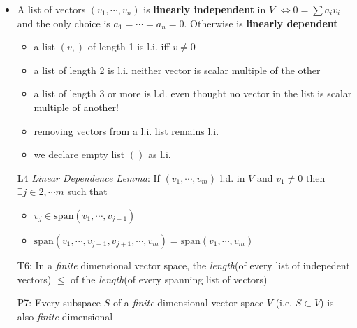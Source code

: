 \begin{itemize}
\item A list of vectors $(v_1,\cdots,v_n)$ is \textbf{linearly independent} in $V$ $\iff 0 = \sum a_i v_i$
and the only choice is $a_1=\cdots=a_n=0$. Otherwise is \textbf{linearly dependent}
\begin{itemize}
  \item a list $(v,)$ of length 1 is l.i. iff $v\neq 0$
  \item a list of length 2 is l.i. neither vector is scalar multiple of the other
  \item a list of length 3 or more is l.d. even thought no vector in the list is scalar multiple of another!
  \item removing vectors from a l.i. list remains l.i.
  \item we declare empty list $()$ as l.i.
\end{itemize}

\item[L4]\emph{Linear Dependence Lemma}: If $(v_1, \cdots, v_m)$ l.d. in $V$ and $v_1\neq 0$ then $\exists j\in 2,\cdots m$ such that
\begin{itemize}
  \item $v_j \in \mathrm{span}(v_1,\cdots, v_{j-1})$
  \item  $\mathrm{span}(v_1,\cdots, v_{j-1}, v_{j+1}, \cdots, v_m) = \mathrm{span}(v_1,\cdots, v_m)$
\end{itemize}
\item[T6:\label{it:T2_6}] In a \emph{finite} dimensional vector space, the \emph{length}(of every list of indepedent vectors) $\leq$ of the \emph{length}(of every spanning list of vectors)
\item[P7:] Every subspace $S$ of a \emph{finite}-dimensional vector space $V$ (i.e. $S\subset V$) is also \emph{finite}-dimensional
%


\end{itemize}
